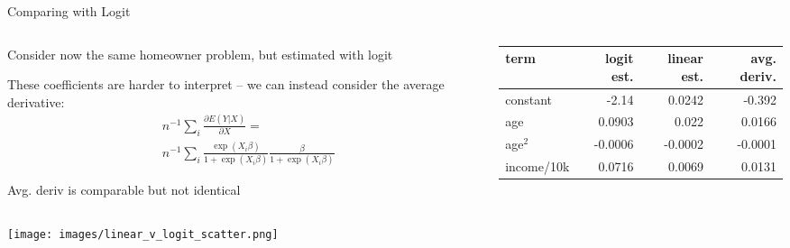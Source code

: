 \documentclass[notes,11pt, aspectratio=169]{beamer}
\newenvironment{wideitemize}{\itemize\addtolength{\itemsep}{10pt}}{\enditemize}
\begin{document}
\begin{frame}{Comparing with Logit}
  \begin{columns}[T] %
    \begin{column}{.35\textwidth}
      \begin{wideitemize}
      \item Consider now the same homeowner problem, but estimated with logit
      \item These coefficients are harder to interpret -- we can
        instead consider the average derivative:
        \begin{align*}
          &n^{-1}\sum_{i} \frac{\partial E(Y|X)}{\partial X} =\\
          &n^{-1}\sum_{i} \frac{\exp(X_{i}\beta)}{1+\exp(X_{i}\beta)}\frac{\beta}{1+\exp(X_{i}\beta)}
        \end{align*}
        \item Avg. deriv is comparable but not identical
      \end{wideitemize}
    \end{column}%
  \hfill%
  \begin{column}{.65\textwidth}
    \begin{center}
    \begin{tabular}{lrrr}
      term  &      logit est. & linear est. & avg. deriv. \\
      \midrule
      constant &      -2.14      &        0.0242 & -0.392 \\
      age      &         0.0903  &          0.022& 0.0166\\
      age$^{2}$ &          -0.0006&         -0.0002 & -0.0001\\
      income/10k     &       0.0716       &     0.0069 & 0.0131  
    \end{tabular}
  \end{center}
  \end{column}
\end{columns}
\end{frame}

\begin{frame}
  \begin{center}
    \texttt{[image: images/linear\_v\_logit\_scatter.png]}
  \end{center}
\end{frame}
  
\end{document}
